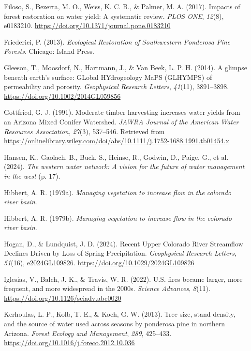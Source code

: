 \documentclass[
]{agujournal2019}
\newlength{\cslhangindent}
\newenvironment{CSLReferences}[2] %
 {\begin{list}{}{%
  \setlength{\itemindent}{0pt}
  \setlength{\leftmargin}{0pt}
  \setlength{\parsep}{0pt}
  \ifodd #1
   \setlength{\leftmargin}{\cslhangindent}
   \setlength{\itemindent}{-1\cslhangindent}
  \fi
  \setlength{\itemsep}{#2\baselineskip}}}
 {\end{list}}
\begin{document}
\begin{CSLReferences}{1}{0}
Filoso, S., Bezerra, M. O., Weiss, K. C. B., \& Palmer, M. A. (2017).
Impacts of forest restoration on water yield: A systematic review.
\emph{PLOS ONE}, \emph{12}(8), e0183210.
\url{https://doi.org/10.1371/journal.pone.0183210}

Friederici, P. (2013). \emph{Ecological Restoration of Southwestern
Ponderosa Pine Forests}. Chicago: Island Press.

Gleeson, T., Moosdorf, N., Hartmann, J., \& Van Beek, L. P. H. (2014). A
glimpse beneath earth's surface: GLobal HYdrogeology MaPS (GLHYMPS) of
permeability and porosity. \emph{Geophysical Research Letters},
\emph{41}(11), 3891--3898. \url{https://doi.org/10.1002/2014GL059856}

Gottfried, G. J. (1991). Moderate timber harvesting increases water
yields from an {Arizona} {Mixed} {Conifer} {Watershed}. \emph{JAWRA
Journal of the American Water Resources Association}, \emph{27}(3),
537--546. Retrieved from
\url{https://onlinelibrary.wiley.com/doi/abs/10.1111/j.1752-1688.1991.tb01454.x}

Hansen, K., Gaolach, B., Buck, S., Heinse, R., Godwin, D., Paige, G., et
al. (2024). \emph{The western water network: A vision for the future of
water management in the west} (p. 17).

Hibbert, A. R. (1979a). \emph{Managing vegetation to increase flow in
the colorado river basin}.

Hibbert, A. R. (1979b). \emph{Managing vegetation to increase flow in
the colorado river basin}.

Hogan, D., \& Lundquist, J. D. (2024). Recent {Upper} {Colorado} {River}
{Streamflow} {Declines} {Driven} by {Loss} of {Spring} {Precipitation}.
\emph{Geophysical Research Letters}, \emph{51}(16), e2024GL109826.
\url{https://doi.org/10.1029/2024GL109826}

Iglesias, V., Balch, J. K., \& Travis, W. R. (2022). U.S. fires became
larger, more frequent, and more widespread in the 2000s. \emph{Science
Advances}, \emph{8}(11). \url{https://doi.org/10.1126/sciadv.abc0020}

Kerhoulas, L. P., Kolb, T. E., \& Koch, G. W. (2013). Tree size, stand
density, and the source of water used across seasons by ponderosa pine
in northern Arizona. \emph{Forest Ecology and Management}, \emph{289},
425--433. \url{https://doi.org/10.1016/j.foreco.2012.10.036}


\end{CSLReferences}
\end{document}
